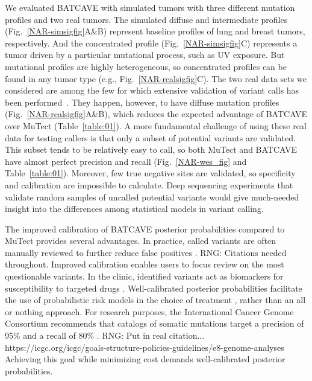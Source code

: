 \documentclass[a4,center,fleqn]{NAR}
\newcommand{\rngcomment}[1]{{\color{red}RNG: #1}}
\newcommand{\batcave}{BATCAVE\xspace}
\begin{document}
We evaluated \batcave with simulated tumors with three different mutation profiles and two real tumors.
The simulated diffuse and intermediate profiles (Fig.~\ref{NAR-simsigfig}A\&B) represent baseline profiles of lung and breast tumors, respectively.
And the concentrated profile (Fig.~\ref{NAR-simsigfig}C) represents a tumor driven by a particular mutational process, such as UV exposure.
But mutational profiles are highly heterogeneous, so concentrated profiles can be found in any tumor type (e.g., Fig.~\ref{NAR-realsigfig}C).
The two real data sets we considered are among the few for which extensive validation of variant calls has been performed~\cite{Griffith2015, Shi2018}.
They happen, however, to have diffuse mutation profiles (Fig.~\ref{NAR-realsigfig}A\&B), which reduces the expected advantage of \batcave over MuTect (Table~\ref{table:01}).
A more fundamental challenge of using these real data for testing callers is that only a subset of potential variants are validated.
This subset tends to be relatively easy to call, so both MuTect and \batcave have almost perfect precision and recall (Fig.~\ref{NAR-wes_fig} and Table~\ref{table:01}).
Moreover, few true negative sites are validated, so specificity and calibration are impossible to calculate.
Deep sequencing experiments that validate random samples of uncalled potential variants would give much-needed insight into the differences among statistical models in variant calling.

The improved calibration of \batcave posterior probabilities compared to MuTect provides several advantages.
In practice, called variants are often manually reviewed to further reduce false positives \cite{XXX}. \rngcomment{Citations needed throughout.}
Improved calibration enables users to focus review on the most questionable variants.
In the clinic, identified variants act as biomarkers for susceptibility to targeted drugs \cite{XXX}.
Well-calibrated posterior probabilities facilitate the use of probabilistic risk models in the choice of treatment \cite{XXX}, rather than an all or nothing approach.
For research purposes, the International Cancer Genome Consortium recommends that catalogs of somatic mutations target a precision of 95\% and a recall of 80\% \cite{XXX}.
\rngcomment{Put in real citation... https://icgc.org/icgc/goals-structure-policies-guidelines/e8-genome-analyses}
Achieving this goal while minimizing cost demands well-calibrated posterior probabilities.
\end{document}
